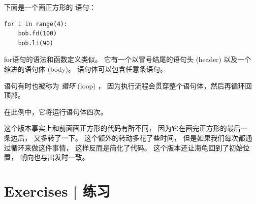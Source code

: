 
下面是一个画正方形的  语句：

\begin{lstlisting}
for i in range(4):
    bob.fd(100)
    bob.lt(90)
\end{lstlisting}


for语句的语法和函数定义类似。
它有一个以冒号结尾的语句头 (header) 以及一个缩进的语句体 (body)。
语句体可以包含任意条语句。


 语句有时也被称为 \emph{循环} (loop) ， 
因为执行流程会贯穿整个语句体，然后再循环回顶部。  

在此例中，它将运行语句体四次。



这个版本事实上和前面画正方形的代码有所不同， 因为它在画完正方形的最后一条边后， 
又多转了一下。  
这个额外的转动多花了些时间，
但是如果我们每次都通过循环来做这件事情， 这样反而是简化了代码。  
这个版本还让海龟回到了初始位置， 朝向也与出发时一致。  



\section{Exercises  |  练习}


